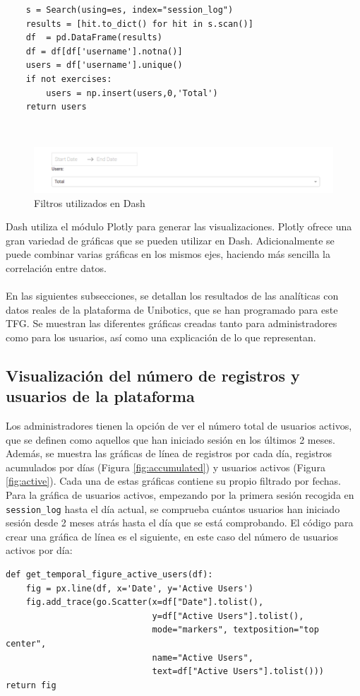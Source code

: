 {\footnotesize
\begin{verbatim}
	s = Search(using=es, index="session_log")
    results = [hit.to_dict() for hit in s.scan()]
    df  = pd.DataFrame(results)
    df = df[df['username'].notna()]
    users = df['username'].unique()
    if not exercises:
        users = np.insert(users,0,'Total')
    return users
\end{verbatim}
}
\\
\begin{figure}[H]
    \centering
    \includegraphics[width=16cm, keepaspectratio]{img/filtros.png}
    \caption{Filtros utilizados en Dash}
    \label{fig:filtros}
\end{figure}

Dash utiliza el módulo Plotly para generar las visualizaciones. Plotly ofrece una gran variedad de gráficas que se pueden utilizar en Dash. Adicionalmente se puede combinar varias gráficas en los mismos ejes, haciendo más sencilla la correlación entre datos.\\

\\
En las siguientes subsecciones, se detallan los resultados de las analíticas con datos reales de la plataforma de Unibotics, que se han programado para este TFG. Se muestran las diferentes gráficas creadas tanto para administradores como para los usuarios, así como una explicación de lo que representan.
\subsection{Visualización del número de registros y usuarios de la plataforma}
Los administradores tienen la opción de ver el número total de usuarios activos, que se definen como aquellos que han iniciado sesión en los últimos 2 meses. Además, se muestra las gráficas de línea de registros por cada día, registros acumulados por días (Figura \ref{fig:accumulated}) y usuarios activos (Figura \ref{fig:active}). Cada una de estas gráficas contiene su propio filtrado por fechas.\\

Para la gráfica de usuarios activos, empezando por la primera sesión recogida en
\texttt{session\_log} hasta el día actual, se comprueba cuántos usuarios han iniciado sesión desde 2 meses atrás hasta el día que se está comprobando. El código para crear una gráfica de línea es el siguiente, en este caso del número de usuarios activos por día:
\newpage
\begin{verbatim}
def get_temporal_figure_active_users(df):
    fig = px.line(df, x='Date', y='Active Users')
    fig.add_trace(go.Scatter(x=df["Date"].tolist(), 
                             y=df["Active Users"].tolist(),
                             mode="markers", textposition="top center", 
                             name="Active Users",
                             text=df["Active Users"].tolist()))
return fig
\end{verbatim}
\\

